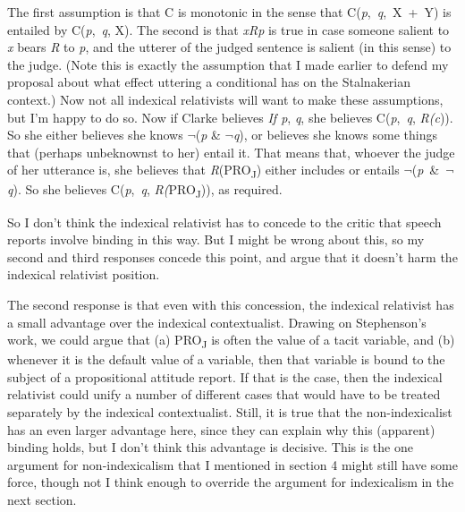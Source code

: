 The first assumption is that C is monotonic in the sense that C(\textit{p},~\textit{q},~X~+~Y) is entailed by C(\textit{p},~\textit{q}, X). The second is that \textit{xRp} is true in case someone salient to \textit{x} bears \textit{R} to \textit{p}, and the utterer of the judged sentence is salient (in this sense) to the judge. (Note this is exactly the assumption that I made earlier to defend my proposal about what effect uttering a conditional has on the Stalnakerian context.) Now not all indexical relativists will want to make these assumptions, but I'm happy to do so. Now if Clarke believes \textit{If p}, \textit{q}, she believes C(\textit{p},~\textit{q}, \textit{R(c})). So she either believes she knows \(\neg\){}(\textit{p} \& \(\neg\){}\textit{q}), or believes she knows some things that (perhaps unbeknownst to her) entail it. That means that, whoever the judge of her utterance is, she believes that \textit{R}(PRO\textsubscript{J}) either includes or entails \(\neg\){}(\textit{p}~\&~\(\neg\){}\textit{q}). So she believes C(\textit{p},~\textit{q}, \textit{R(}PRO\textsubscript{J})), as required.

So I don't think the indexical relativist has to concede to the critic that speech reports involve binding in this way. But I might be wrong about this, so my second and third responses concede this point, and argue that it doesn't harm the indexical relativist position. 

The second response is that even with this concession, the indexical relativist has a small advantage over the indexical contextualist. Drawing on Stephenson's work, we could argue that (a) PRO\textsubscript{J} is often the value of a tacit variable, and (b) whenever it is the default value of a variable, then that variable is bound to the subject of a propositional attitude report. If that is the case, then the indexical relativist could unify a number of different cases that would have to be treated separately by the indexical contextualist. Still, it is true that the non-indexicalist has an even larger advantage here, since they can explain why this (apparent) binding holds, but I don't think this advantage is decisive. This is the one argument for non-indexicalism that I mentioned in section 4 might still have some force, though not I think enough to override the argument for indexicalism in the next section.

